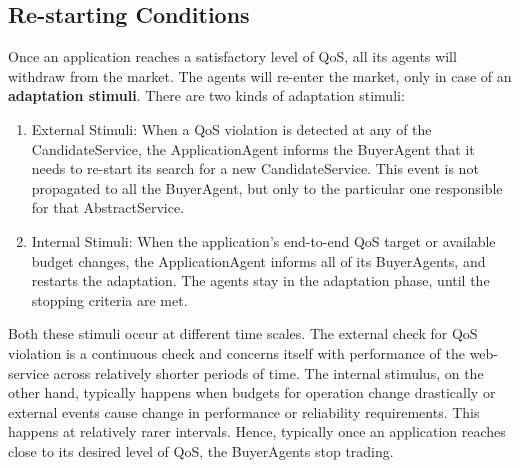 \documentclass[10pt,journal,compsoc]{IEEEtran}
\begin{document}
\subsection{Re-starting Conditions}
Once an application reaches a satisfactory level of QoS, all its agents will withdraw from the market. The agents will re-enter the market, only in case of an \textbf{adaptation stimuli}. There are two kinds of adaptation stimuli:
	\begin{enumerate}
	    \item External Stimuli: When a QoS violation is detected at any of the CandidateService, the ApplicationAgent informs the BuyerAgent that it needs to re-start its search for a new CandidateService. This event is not propagated to all the BuyerAgent, but only to the particular one responsible for that AbstractService.
	     \item Internal Stimuli: When the application's end-to-end QoS target or available budget changes, the ApplicationAgent informs all of its BuyerAgents, and restarts the adaptation. The agents stay in the adaptation phase, until the stopping criteria are met.
	\end{enumerate}
Both these stimuli occur at different time scales. The external check for QoS violation is a continuous check and concerns itself with performance of the web-service across relatively shorter periods of time. The internal stimulus, on the other hand, typically happens when budgets for operation change drastically or external events cause change in performance or reliability requirements. This happens at relatively rarer intervals. Hence, typically once an application reaches close to its desired level of QoS, the BuyerAgents stop trading.
\end{document}
